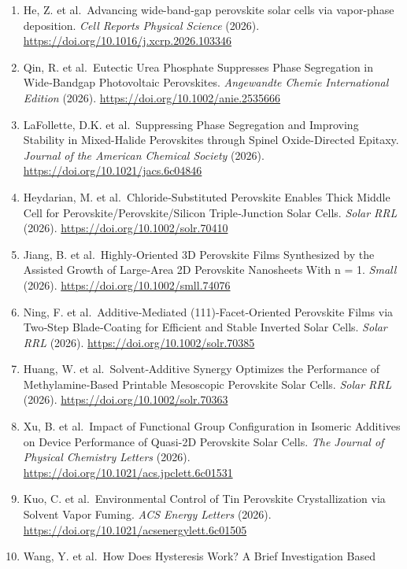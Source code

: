 \documentclass[
  11pt,
]{article}
\begin{document}
\begin{enumerate}
  Stable CsPbI 3 Perovskite Solar Cells. \emph{The Journal of Physical
  Chemistry Letters} (2026).
  \url{https://doi.org/10.1021/acs.jpclett.6c01395}
\item
  He, Z. et al.~Advancing wide-band-gap perovskite solar cells via
  vapor-phase deposition. \emph{Cell Reports Physical Science} (2026).
  \url{https://doi.org/10.1016/j.xcrp.2026.103346}
\item
  Qin, R. et al.~Eutectic Urea Phosphate Suppresses Phase Segregation in
  Wide‐Bandgap Photovoltaic Perovskites. \emph{Angewandte Chemie
  International Edition} (2026).
  \url{https://doi.org/10.1002/anie.2535666}
\item
  LaFollette, D.K. et al.~Suppressing Phase Segregation and Improving
  Stability in Mixed-Halide Perovskites through Spinel Oxide-Directed
  Epitaxy. \emph{Journal of the American Chemical Society} (2026).
  \url{https://doi.org/10.1021/jacs.6c04846}
\item
  Heydarian, M. et al.~Chloride‐Substituted Perovskite Enables Thick
  Middle Cell for Perovskite/Perovskite/Silicon Triple‐Junction Solar
  Cells. \emph{Solar RRL} (2026).
  \url{https://doi.org/10.1002/solr.70410}
\item
  Jiang, B. et al.~Highly‐Oriented 3D Perovskite Films Synthesized by
  the Assisted Growth of Large‐Area 2D Perovskite Nanosheets With n = 1.
  \emph{Small} (2026). \url{https://doi.org/10.1002/smll.74076}
\item
  Ning, F. et al.~Additive‐Mediated (111)‐Facet‐Oriented Perovskite
  Films via Two‐Step Blade‐Coating for Efficient and Stable Inverted
  Solar Cells. \emph{Solar RRL} (2026).
  \url{https://doi.org/10.1002/solr.70385}
\item
  Huang, W. et al.~Solvent‐Additive Synergy Optimizes the Performance of
  Methylamine‐Based Printable Mesoscopic Perovskite Solar Cells.
  \emph{Solar RRL} (2026). \url{https://doi.org/10.1002/solr.70363}
\item
  Xu, B. et al.~Impact of Functional Group Configuration in Isomeric
  Additives on Device Performance of Quasi-2D Perovskite Solar Cells.
  \emph{The Journal of Physical Chemistry Letters} (2026).
  \url{https://doi.org/10.1021/acs.jpclett.6c01531}
\item
  Kuo, C. et al.~Environmental Control of Tin Perovskite Crystallization
  via Solvent Vapor Fuming. \emph{ACS Energy Letters} (2026).
  \url{https://doi.org/10.1021/acsenergylett.6c01505}
\item
  Wang, Y. et al.~How Does Hysteresis Work? A Brief Investigation Based

\end{enumerate}
\end{document}
